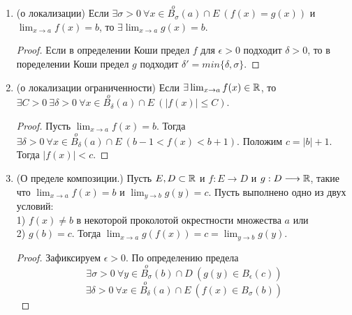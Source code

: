 \begin{enumerate}
        Заключение следует понимать так: если существует величина справа, то существует величина слева и они равны.
        \begin{proof}
            Рассмотрим произвольную последовательность $\{x_{n}\} \in E$ с условиями $x_{n} \to a$ и $x_{n} \neq a$. Тогда $f(x_{n}) \to b$ и $g(x_{n}) \to c$. По свойствам предела последовательности $f(x_{n}) \pm g(x_{n}) \to b \pm c$, $f(x_{n}) \cdot g(x_{n}) \to b \cdot c$, $\frac{f(x_{n})}{g(x_{n})} \to \frac{b}{c}$. Осталось воспользоваться определением предела по Гейне.
        \end{proof}
        \item (о локализации) Если $\exists \sigma > 0 \ \forall x \in \overset{o}{B_{\sigma}}(a) \cap E \ (f(x) = g(x))$ и $\lim_{x \rightarrow a} f(x) = b$, то $\exists \lim_{x \rightarrow a} g(x) = b$.
        \begin{proof}
            Если в определении Коши предел $f$ для $\epsilon > 0$ подходит $\delta > 0$, то в поределении Коши предел $g$ подходит $\delta' = min\{\delta, \sigma\}$.
        \end{proof}
        \item (о локализации ограниченности) Если $\exists \lim_{x \rightarrow a} f(x) \in \mathbb{R}$, то $\exists C > 0 \ \exists \delta > 0 \ \forall x \in \overset{o}{B_{\delta}}(a) \cap E \ (|f(x)| \leq C)$.
        \begin{proof}
            Пусть $\lim_{x \rightarrow a} f(x) = b$. Тогда $\exists \delta > 0 \ \forall x \in \overset{o}{B_{\delta}}(a) \cap E \ (b - 1 < f(x) < b + 1)$. Положим $c = |b| + 1$. Тогда $|f(x)| < c$.
        \end{proof}
        \item (О пределе композиции.) Пусть $E, D \subset \mathbb{R}$ и $f: E \longrightarrow D$ и $g: D \longrightarrow \mathbb{R}$, такие что $\lim_{x \rightarrow a} f(x) = b$ и $\lim_{y \rightarrow b} g(y) = c$. Пусть выполнено одно из двух условий: 
        \\
        1) $f(x) \neq b$ в некоторой проколотой окрестности множества $a$ или 
        \\
        2) $g(b) = c$. Тогда $\lim_{x \rightarrow a} g(f(x)) = c = \lim_{y \rightarrow b} g(y)$.
        \begin{proof}
            Зафиксируем $\epsilon > 0$. По определению предела
            \[\exists \sigma > 0 \ \forall y \in \overset{o}{B_{\sigma}}(b) \cap D \ (g(y) \in \overset{}{B_{\epsilon}}(c))\]
            \[\exists \delta > 0 \ \forall x \in \overset{o}{B_{\delta}}(a) \cap E \ (f(x) \in \overset{}{B_{\sigma}}(b))\]

\end{proof}
\end{enumerate}
